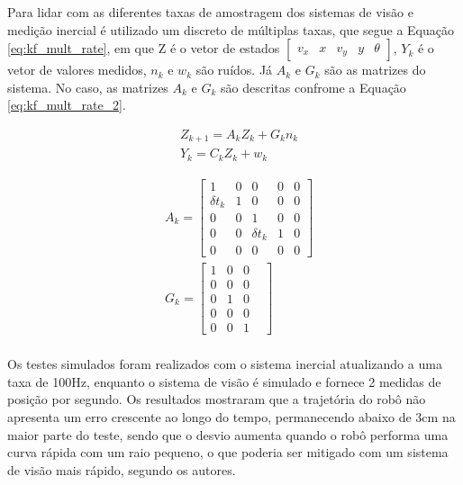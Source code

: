 \documentclass[acronym, symbols, table]{fei}
\begin{document}
Para lidar com as diferentes taxas de amostragem dos sistemas de visão e medição inercial é utilizado um  discreto de múltiplas taxas, que segue a Equação \ref{eq:kf_mult_rate}, em que Z é o vetor de estados $\begin{bmatrix} v_x & x & v_y & y & \theta \end{bmatrix}$, $Y_k$ é o vetor de valores medidos, $n_k$ e $w_k$ são ruídos. Já $A_k$ e $G_k$ são as matrizes do sistema. No caso, as matrizes $A_k$ e $G_k$ são descritas confrome a Equação \ref{eq:kf_mult_rate_2}.

\begin{equation}\label{eq:kf_mult_rate}
	\begin{split}
		&Z_{k+1} = A_kZ_k + G_kn_k \\
		&Y_k = C_kZ_k + w_k
	\end{split}
\end{equation}

\begin{equation}\label{eq:kf_mult_rate_2}
	\begin{split}
		&A_k = \begin{bmatrix}
			1 & 0 & 0 & 0 & 0 \\
			\delta t_k & 1 & 0 & 0 & 0 \\
			0 & 0 & 1 & 0 & 0 \\
			0 & 0 & \delta t_k & 1 & 0\\
			0 & 0 & 0 & 0 & 0
		\end{bmatrix} \\
		&G_k = \begin{bmatrix}
			1 & 0 & 0 & \\
			0 & 0 & 0 \\
			0 & 1 & 0 \\
			0 & 0 & 0 \\ 
			0 & 0 & 1
		\end{bmatrix} \\
	\end{split}
\end{equation}

Os testes simulados foram realizados com o sistema inercial atualizando a uma taxa de 100Hz, enquanto o sistema de visão é simulado e fornece 2 medidas de posição por segundo. Os resultados mostraram que a trajetória do robô não apresenta um erro crescente ao longo do tempo, permanecendo abaixo de 3cm na maior parte do teste, sendo que o desvio aumenta quando o robô performa uma curva rápida com um raio pequeno, o que poderia ser mitigado com um sistema de visão mais rápido, segundo os autores.
\end{document}
